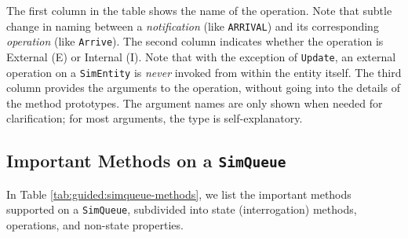 The first column in the table shows the name of the operation.
Note that subtle change in naming between
a {\em notification\/} (like \lstinline|ARRIVAL|)
and its corresponding {\em operation\/} (like \lstinline|Arrive|).
The second column indicates whether the operation
is External (E) or Internal (I).
Note that with the exception of \lstinline|Update|,
an external operation on a \lstinline|SimEntity|
is {\em never\/} invoked from within the entity itself.
The third column provides the arguments to the operation,
without going into the details of the method prototypes.
The argument names are only shown when needed for clarification;
for most arguments, the type is self-explanatory.

\subsection{Important Methods on a \texttt{SimQueue}}

In Table \ref{tab:guided:simqueue-methods},
we list the important methods supported on a \lstinline|SimQueue|,
subdivided into state (interrogation) methods,
operations,
and non-state properties.

